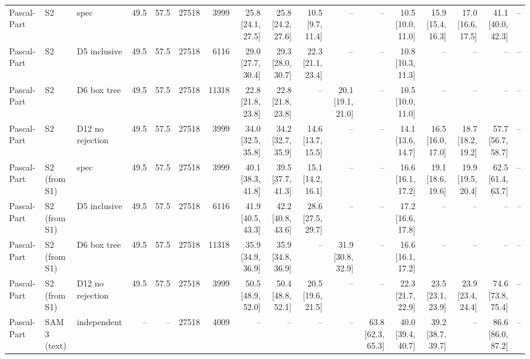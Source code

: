 \begin{tabular}{lllrrrrrrrrrrrrrl}
Pascal-Part & S2 & spec & 49.5 & 57.5 & 27518 & 3999 & 25.8 \scriptsize{[24.1, 27.5]} & 25.8 \scriptsize{[24.2, 27.6]} & 10.5 \scriptsize{[9.7, 11.4]} & -- & -- & 10.5 \scriptsize{[10.0, 11.0]} & 15.9 \scriptsize{[15.4, 16.3]} & 17.0 \scriptsize{[16.6, 17.5]} & 41.1 \scriptsize{[40.0, 42.3]} & -- \\
Pascal-Part & S2 & D5 inclusive & 49.5 & 57.5 & 27518 & 6116 & 29.0 \scriptsize{[27.7, 30.4]} & 29.3 \scriptsize{[28.0, 30.7]} & 22.3 \scriptsize{[21.1, 23.4]} & -- & -- & 10.8 \scriptsize{[10.3, 11.3]} & -- & -- & -- & -- \\
Pascal-Part & S2 & D6 box tree & 49.5 & 57.5 & 27518 & 11318 & 22.8 \scriptsize{[21.8, 23.8]} & 22.8 \scriptsize{[21.8, 23.8]} & -- & 20.1 \scriptsize{[19.1, 21.0]} & -- & 10.5 \scriptsize{[10.0, 11.0]} & -- & -- & -- & -- \\
Pascal-Part & S2 & D12 no rejection & 49.5 & 57.5 & 27518 & 3999 & 34.0 \scriptsize{[32.5, 35.8]} & 34.2 \scriptsize{[32.7, 35.9]} & 14.6 \scriptsize{[13.7, 15.5]} & -- & -- & 14.1 \scriptsize{[13.6, 14.7]} & 16.5 \scriptsize{[16.0, 17.0]} & 18.7 \scriptsize{[18.2, 19.2]} & 57.7 \scriptsize{[56.7, 58.7]} & -- \\
Pascal-Part & S2 (from S1) & spec & 49.5 & 57.5 & 27518 & 3999 & 40.1 \scriptsize{[38.3, 41.8]} & 39.5 \scriptsize{[37.7, 41.3]} & 15.1 \scriptsize{[14.2, 16.1]} & -- & -- & 16.6 \scriptsize{[16.1, 17.2]} & 19.1 \scriptsize{[18.6, 19.6]} & 19.9 \scriptsize{[19.5, 20.4]} & 62.5 \scriptsize{[61.4, 63.7]} & -- \\
Pascal-Part & S2 (from S1) & D5 inclusive & 49.5 & 57.5 & 27518 & 6116 & 41.9 \scriptsize{[40.5, 43.3]} & 42.2 \scriptsize{[40.8, 43.6]} & 28.6 \scriptsize{[27.5, 29.7]} & -- & -- & 17.2 \scriptsize{[16.6, 17.8]} & -- & -- & -- & -- \\
Pascal-Part & S2 (from S1) & D6 box tree & 49.5 & 57.5 & 27518 & 11318 & 35.9 \scriptsize{[34.9, 36.9]} & 35.9 \scriptsize{[34.8, 36.9]} & -- & 31.9 \scriptsize{[30.8, 32.9]} & -- & 16.6 \scriptsize{[16.1, 17.2]} & -- & -- & -- & -- \\
Pascal-Part & S2 (from S1) & D12 no rejection & 49.5 & 57.5 & 27518 & 3999 & 50.5 \scriptsize{[48.9, 52.0]} & 50.4 \scriptsize{[48.8, 52.1]} & 20.5 \scriptsize{[19.6, 21.5]} & -- & -- & 22.3 \scriptsize{[21.7, 22.9]} & 23.5 \scriptsize{[23.1, 23.9]} & 23.9 \scriptsize{[23.4, 24.4]} & 74.6 \scriptsize{[73.8, 75.4]} & -- \\
\midrule
Pascal-Part & SAM 3 (text) & independent & -- & -- & 27518 & 4009 & -- & -- & -- & -- & 63.8 \scriptsize{[62.3, 65.3]} & 40.0 \scriptsize{[39.4, 40.7]} & 39.2 \scriptsize{[38.7, 39.7]} & -- & 86.6 \scriptsize{[86.0, 87.2]} & -- \\

\end{tabular}

